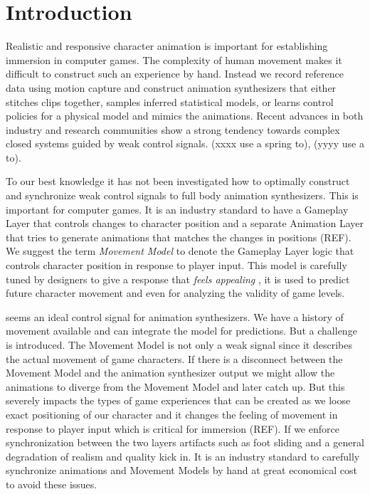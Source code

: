 \section{Introduction}
Realistic and responsive character animation is important for establishing immersion in computer games. The complexity of human movement makes it difficult to construct such an experience by hand. Instead we record reference data using motion capture and construct animation synthesizers that either stitches clips together, samples inferred statistical models, or learns control policies for a physical model and mimics the animations. Recent advances in both industry and research communities show a strong tendency towards complex closed systems guided by weak control signals. (xxxx use a spring to), (yyyy use a to).

To our best knowledge it has not been investigated how to optimally construct and synchronize weak control signals to full body animation synthesizers. This is important for computer games. It is an industry standard to have a Gameplay Layer  that controls changes to character position and a separate Animation Layer  that tries to generate animations that matches the changes in positions (REF). We suggest the term \textit{Movement Model} to denote the Gameplay Layer logic that controls character position in response to player input. This model is carefully tuned by designers to give a response that \textit{feels appealing} , it is used to predict future character movement and even for analyzing the validity of game levels. 

seems an ideal control signal for animation synthesizers. We have a history of movement available and can integrate the model for predictions. But a challenge is introduced. The Movement Model is not only a weak signal since it describes the actual movement of game characters. If there is a disconnect between the Movement Model and the animation synthesizer output we might allow the animations to diverge from the Movement Model and later catch up. But this severely impacts the types of game experiences that can be created as we loose exact positioning of our character and it changes the feeling of movement in response to player input which is critical for immersion (REF). If we enforce synchronization between the two layers artifacts such as foot sliding and a general degradation of realism and quality kick in. It is an industry standard to carefully synchronize animations and Movement Models by hand at great economical cost to avoid these issues.

